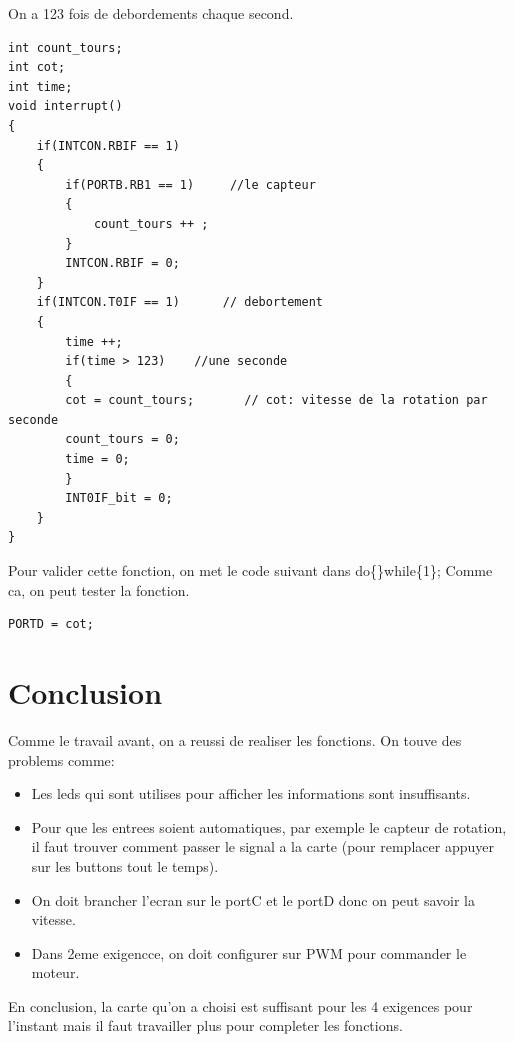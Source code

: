 \documentclass{article}
\begin{document}
On a 123 fois de debordements chaque second.
\begin{lstlisting}[frame=shadowbox]
int count_tours;
int cot;
int time;
void interrupt()                           
{
	if(INTCON.RBIF == 1)
	{
		if(PORTB.RB1 == 1)     //le capteur
		{
			count_tours ++ ;
		}
		INTCON.RBIF = 0;
	}
	if(INTCON.T0IF == 1)      // debortement
	{
		time ++;
		if(time > 123)    //une seconde
		{
		cot = count_tours;       // cot: vitesse de la rotation par seconde
		count_tours = 0;
		time = 0;
		} 
		INT0IF_bit = 0;
	}
}
\end{lstlisting}
Pour valider cette fonction, on met le code suivant dans do\{\}while\{1\}; Comme ca, on peut tester la fonction.
\begin{lstlisting}[frame=shadowbox]
PORTD = cot;
\end{lstlisting}
\pagebreak

\section{Conclusion}
Comme le travail avant, on a reussi de realiser les fonctions. On touve des problems comme:
\begin{itemize}
 \item Les leds qui sont utilises pour afficher les informations sont insuffisants.
 \item Pour que les entrees soient automatiques, par exemple le capteur de rotation, il faut trouver comment passer le signal a la carte (pour remplacer appuyer sur les buttons tout le temps).
 \item On doit brancher l'ecran sur le portC et le portD donc on peut savoir la vitesse.
 \item Dans 2eme exigencce, on doit configurer sur PWM pour commander le moteur.
\end{itemize}

En conclusion, la carte qu'on a choisi est suffisant pour les 4 exigences pour l'instant mais il faut travailler plus pour completer les fonctions.
\end{document}
